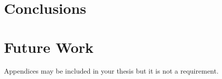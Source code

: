 \documentclass[a4paper,12pt]{article}
\begin{document}
\clearpage
\section{Conclusions}
\label{sec:conclusions}

\lipsum[4]

\lipsum[3]

\section{Future Work}
\label{sec:futwork}

\lipsum[10]

\newpage

\medskip




\clearpage
\newpage
\begin{appendices}

{Appendices may be included in your thesis but it is not a requirement.}

\end{appendices}
\end{document}
